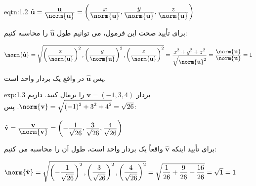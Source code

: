 {\begin{spacing}{1.5}
        \begin{eqtn}{eqtn:1.2}
            \centering
            $\hat{\textbf{u}}=\frac{\displaystyle\textbf{u}}{\displaystyle\norm{\textbf{u}}}=\left(\frac{\displaystyle x}{\displaystyle\norm{\textbf{u}}},
            \frac{\displaystyle y}{\displaystyle\norm{\textbf{u}}}, \frac{\displaystyle z}{\displaystyle\norm{\textbf{u}}}\right)$
        \end{eqtn}

        برای تأیید صحت این فرمول، می توانیم طول $\hat{\textbf{u}}$ را محاسبه کنیم:

        \begin{center}
            $\norm{\hat{\textbf{u}}}=\sqrt{\displaystyle \left(\frac{\displaystyle x}{\displaystyle\norm{\textbf{u}}}\right)^2,
                \left(\frac{\displaystyle y}{\displaystyle\norm{\textbf{u}}}\right)^2,
                \left(\frac{\displaystyle z}{\displaystyle\norm{\textbf{u}}}\right)^2}=\frac{\displaystyle x^2+y^2+z^2}{\displaystyle\sqrt{\displaystyle \norm{\textbf{u}}^2}}
            =\frac{\displaystyle\norm{\textbf{u}}}{\displaystyle\norm{\textbf{u}}}=1$
        \end{center}

        پس $\hat{\textbf{u}}$ در واقع یک بردار واحد است.

        \begin{example}{exp:1.3}
            بردار $\textbf{v}=(-1,3,4)$ را نرمال کنید. داریم $\norm{\textbf{v}}=\sqrt{\displaystyle (-1)^2+3^2+4^2}=\sqrt{\displaystyle 26}$. پس:

            \begin{center}
                $\hat{\textbf{v}}=\frac{\displaystyle\textbf{v}}{\displaystyle\norm{\textbf{v}}}=\left(-\frac{\displaystyle 1}{\displaystyle\sqrt{\displaystyle 26}},
                \frac{\displaystyle 3}{\displaystyle\sqrt{\displaystyle 26}}, \frac{\displaystyle 4}{\displaystyle\sqrt{\displaystyle 26}}\right)$
            \end{center}

            برای تأیید اینکه $\hat{\textbf{v}}$ واقعاً یک بردار واحد است، طول آن را محاسبه می کنیم:

            \begin{center}
                $\norm{\hat{\textbf{v}}}=\sqrt{\displaystyle \left(-\frac{\displaystyle 1}{\displaystyle\sqrt{\displaystyle 26}}\right)^2,
                    \left(\frac{\displaystyle 3}{\displaystyle\sqrt{\displaystyle 26}}\right)^2, \left(\frac{\displaystyle 4}{\displaystyle\sqrt{\displaystyle 26}}\right)^2}=
                \sqrt{\displaystyle\frac{\displaystyle 1}{\displaystyle 26}+\frac{\displaystyle 9}{\displaystyle 26}+\frac{\displaystyle 16}{\displaystyle 26}}=\sqrt{\displaystyle 1}=1$
            \end{center}
        \end{example}
    \end{spacing}
}


